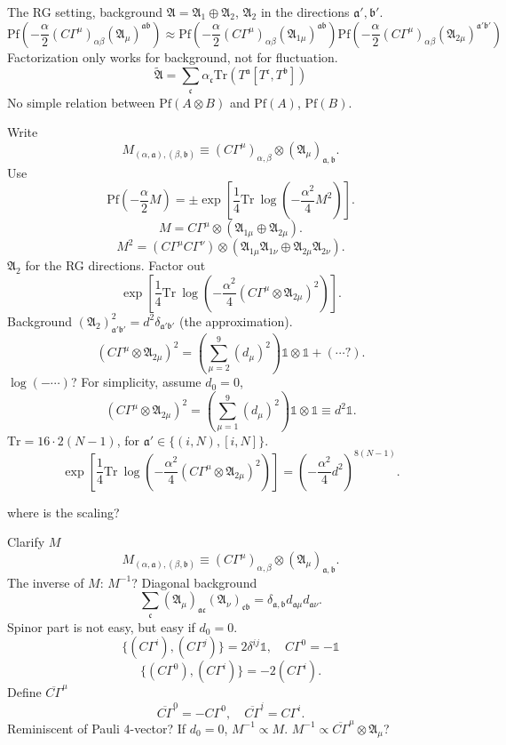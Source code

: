 The RG setting, background $\mathfrak{A}=\mathfrak{A}_1 \oplus \mathfrak{A}_2$,
$\mathfrak{A}_2$ in the directions $\mathfrak{a}',\mathfrak{b}'$.
\[
	\mathrm{Pf}\left( -\frac{\alpha}{2} 
			(C\Gamma^\mu)_{\alpha\beta}
				(\mathfrak{A}_\mu)^{\mathfrak{a}\mathfrak{b}}\right) 
\approx \mathrm{Pf} \left( 
-\frac{\alpha}{2} (C\Gamma^\mu)_{\alpha\beta}
(\mathfrak{A}_{1\mu})^{\mathfrak{a}\mathfrak{b}}\right) 
\mathrm{Pf} \left( 
-\frac{\alpha}{2} (C\Gamma^\mu)_{\alpha\beta}
(\mathfrak{A}_{2\mu})^{\mathfrak{a}'\mathfrak{b}'}\right) 
\]
Factorization only works for background, not for fluctuation.
\[
	\tilde{\mathfrak{A}} = \sum_{\mathfrak{c}} \alpha_{\mathfrak{c}}
	\mathrm{Tr}(T^{\mathfrak{a}} [T^{\mathfrak{c}},T^{\mathfrak{b}}])
\] 
No simple relation between $\mathrm{Pf}(A\otimes B)$ and $\mathrm{Pf}(A)$,
$\mathrm{Pf}(B)$.

Write
\[
M_{(\alpha,\mathfrak{a}),(\beta,\mathfrak{b})}  
\equiv (C\Gamma^\mu)_{\alpha,\beta} \otimes (\mathfrak{A}_\mu)_{\mathfrak{a},\mathfrak{b}}
.\] 
Use
\[
\mathrm{Pf} \left( - \frac{\alpha}{2} M \right) 
= \pm \mathrm{\exp} \left[ 
\frac{1}{4} \mathrm{Tr}~\log \left( -\frac{\alpha^2}{4} M^2 \right)
\right] 
.\] 
\[
	M
	= C\Gamma^\mu \otimes (\mathfrak{A}_{1\mu} \oplus \mathfrak{A}_{2\mu})
.\] 
\[
M^2 = (C\Gamma^\mu C\Gamma^\nu) \otimes 
(\mathfrak{A}_{1\mu} \mathfrak{A}_{1\nu} \oplus
\mathfrak{A}_{2\mu} \mathfrak{A}_{2\nu})
.\] 
$\mathfrak{A}_2$ for the RG directions.
Factor out
\[
	\mathrm{\exp}\left[ \frac{1}{4} \mathrm{Tr}~ \log
\left( - \frac{\alpha^2}{4} (C\Gamma^\mu \otimes \mathfrak{A}_{2\mu})^2 \right) \right] 
.\] 
Background $(\mathfrak{A}_2)^2_{\mathfrak{a}'\mathfrak{b}'} = d^2 
\delta_{\mathfrak{a}'\mathfrak{b}'}$ (the approximation).
\[
(C\Gamma^\mu \otimes \mathfrak{A}_{2\mu})^2
= \left( \sum_{\mu=2}^9 (d_\mu)^2 \right) \mathds{1}\otimes\mathds{1}
+ (\cdots ?)
.\] 
$\log(-\cdots)$?
For simplicity, assume $d_0 = 0$,
\[
(C\Gamma^\mu \otimes \mathfrak{A}_{2\mu})^2
= \left( \sum_{\mu=1}^9 (d_\mu)^2 \right) \mathds{1}\otimes\mathds{1}
\equiv d^2 \mathds{1}
.\] 
$\mathrm{Tr} = 16 \cdot 2(N-1)$, for $\mathfrak{a}'\in \{ (i,N),[i,N]\}$.
\[
	\mathrm{\exp}\left[ \frac{1}{4} \mathrm{Tr}~ \log
\left( - \frac{\alpha^2}{4} (C\Gamma^\mu \otimes \mathfrak{A}_{2\mu})^2 \right) \right] 
= \left( - \frac{\alpha^2}{4} d^2 \right) ^{8(N-1)}
.\] 
\begin{question}
	where is the scaling?
\end{question}

Clarify $M$
\[
	M_{(\alpha,\mathfrak{a}),(\beta,\mathfrak{b})}  
	\equiv (C\Gamma^\mu)_{\alpha,\beta} \otimes (\mathfrak{A}_\mu)_{\mathfrak{a},\mathfrak{b}}
.\] 
The inverse of $M$: $M^{-1}$?
Diagonal background
\[
	\sum_{\mathfrak{c}}
	(\mathfrak{A}_\mu)_{\mathfrak{a}\mathfrak{c}}
	(\mathfrak{A}_\nu)_{\mathfrak{c}\mathfrak{b}}
	= \delta_{\mathfrak{a},\mathfrak{b}} d_{\mathfrak{a}\mu}
	d_{\mathfrak{a}\nu}
.\] 
Spinor part is not easy, but easy if $d_0 = 0$.
\[
	\{(C\Gamma^i),(C\Gamma^j)\} = 2\delta^{ij}\mathds{1},\quad
	C\Gamma^0 = -  \mathds{1}
\] 
\[
	\{ (C\Gamma^0),(C\Gamma^i)\} = - 2 (C\Gamma^i)
.\] 
Define $\overline{C\Gamma}^\mu$
\[
	\overline{C\Gamma}^0 = - C\Gamma^0,\quad
	\overline{C\Gamma}^i = C\Gamma^i
.\] 
Reminiscent of Pauli $4$-vector?
If $d_0=0$, $M^{-1} \propto M$.
$M^{-1} \propto \overline{C\Gamma}^\mu \otimes \mathfrak{A}_\mu$?

